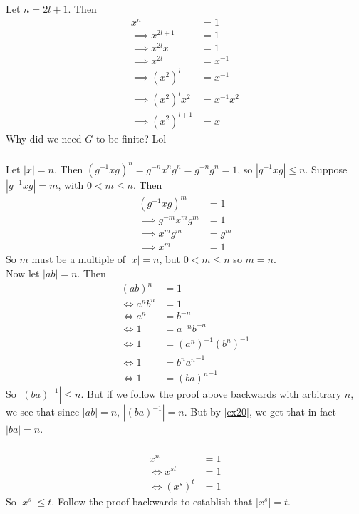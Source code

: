 \documentclass{article}
\newcommand{\inv}[1]{ {#1}^{-1} }
\begin{document}
\subsubsection{}
Let $n=2l+1$. Then
\begin{align*}
x^n &= 1\\
\implies x^{2l+1} &= 1\\
\implies x^{2l}x &= 1\\
\implies x^{2l} &= \inv{x}\\
\implies (x^2)^l &= \inv{x}\\
\implies (x^2)^lx^2 &= \inv{x}x^2\\
\implies (x^2)^{l+1} &= x
\end{align*}
Why did we need $G$ to be finite? Lol
\subsubsection{}
\newcommand{\gxg}{\inv{g}xg}
Let $|x| = n$. Then $(\inv{g}xg)^n = g^{-n}x^ng^n = g^{-n}g^n = 1$, so $|\gxg| \leq n$. Suppose $|\gxg| = m$, with $0 < m \leq n$. Then 
\begin{align*}
(\gxg)^m &= 1\\
\implies g^{-m}x^mg^m &= 1\\
\implies x^mg^m &= g^m\\
\implies x^m &= 1
\end{align*}
So $m$ must be a multiple of $|x|=n$, but $0 < m \leq n$ so $m=n$.\\
Now let $|ab| = n$. Then
\begin{align*}
(ab)^n &= 1\\
\iff a^nb^n &= 1\\
\iff a^n &= b^{-n}\\
\iff 1 &= a^{-n}b^{-n}\\
\iff 1 &= \inv{(a^n)}\inv{(b^n)}\\
\iff 1 &= \inv{b^na^n}\\
\iff 1 &= \inv{(ba)^n}
\end{align*}
So $|\inv{(ba)}| \leq n$. But if we follow the proof above backwards with arbitrary $n$, we see that since $|ab| = n$, $|\inv{(ba)}| = n$. But by \ref{ex20}, we get that in fact $|ba| = n$.
\subsubsection{}
\begin{align*}
x^n &= 1\\
\iff x^{st} &= 1\\
\iff (x^s)^t &= 1
\end{align*}
So $|x^s| \leq t$. Follow the proof backwards to establish that $|x^s| = t$.
\end{document}
